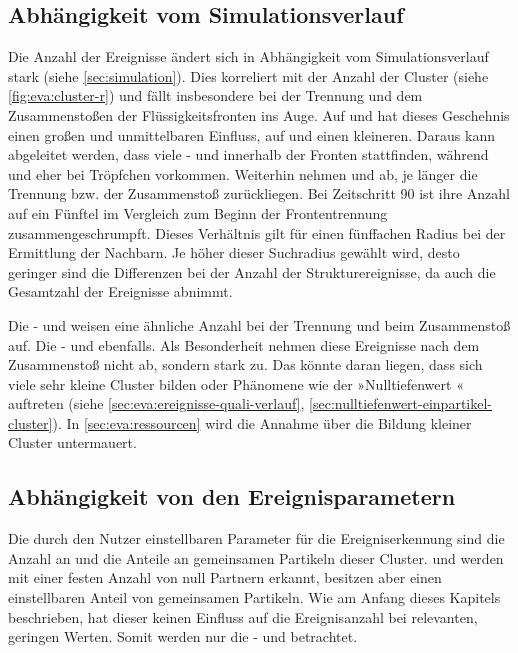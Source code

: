 \subsection*{Abhängigkeit vom Simulationsverlauf}\label{sec:eva:ereignis-verlauf}
Die Anzahl der Ereignisse ändert sich in Abhängigkeit vom Simulationsverlauf stark (siehe \autoref{sec:simulation}). Dies korreliert mit der Anzahl der Cluster (siehe \autoref{fig:eva:cluster-r}) und fällt insbesondere bei der Trennung und dem Zusammenstoßen der Flüssigkeitsfronten ins Auge. Auf  und  hat dieses Geschehnis einen großen und unmittelbaren Einfluss, auf  und  einen kleineren.
Daraus kann abgeleitet werden, dass viele - und  innerhalb der Fronten stattfinden, während  und  eher bei Tröpfchen vorkommen. Weiterhin nehmen  und  ab, je länger die Trennung bzw. der Zusammenstoß zurückliegen. Bei Zeitschritt 90 ist ihre Anzahl auf ein Fünftel im Vergleich zum Beginn der Frontentrennung zusammengeschrumpft. Dieses Verhältnis gilt für einen fünffachen Radius bei der Ermittlung der Nachbarn. Je höher dieser Suchradius gewählt wird, desto geringer sind die Differenzen bei der Anzahl der Strukturereignisse, da auch die Gesamtzahl der Ereignisse abnimmt.

Die - und  weisen eine ähnliche Anzahl bei der Trennung und beim Zusammenstoß auf. Die - und  ebenfalls. Als Besonderheit nehmen diese Ereignisse nach dem Zusammenstoß nicht ab, sondern stark zu. Das könnte daran liegen, dass sich viele sehr kleine Cluster bilden oder Phänomene wie der »Nulltiefenwert « auftreten (siehe \autoref{sec:eva:ereignisse-quali-verlauf}, \autoref{sec:nulltiefenwert-einpartikel-cluster}). In \autoref{sec:eva:ressourcen} wird die Annahme über die Bildung kleiner Cluster untermauert.

\subsection*{Abhängigkeit von den Ereignisparametern}\label{sec:eva:ereignis-param}
Die durch den Nutzer einstellbaren Parameter für die Ereigniserkennung sind die Anzahl an  und die Anteile an gemeinsamen Partikeln dieser Cluster.  und  werden mit einer festen Anzahl von null Partnern erkannt, besitzen aber einen einstellbaren Anteil von gemeinsamen Partikeln. Wie am Anfang dieses Kapitels beschrieben, hat dieser keinen Einfluss auf die Ereignisanzahl bei relevanten, geringen Werten. Somit werden nur die - und  betrachtet.

